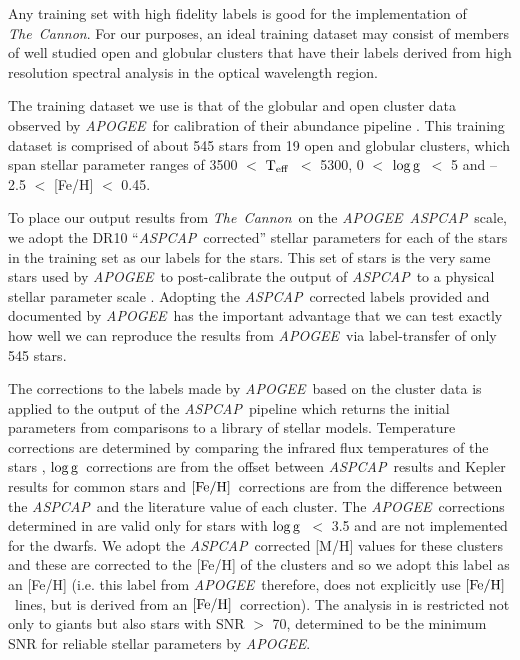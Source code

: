 \documentclass[12pt, preprint]{aastex}
\newcommand{\teff}{\mbox{$\rm T_{eff}$}}
\newcommand{\feh}{\mbox{$\rm [Fe/H]$}}
\newcommand{\logg}{\mbox{$\rm \log g$}}
\newcommand{\tc}{\textsl{The~Cannon}}
\newcommand{\apogee}{\textsl{APOGEE}}
\newcommand{\aspcap}{\textsl{ASPCAP}}
\begin{document}
Any training set with high fidelity labels is good for the implementation of \tc. For our purposes, an ideal training dataset may consist of members of
well studied open and globular clusters that have their labels derived from high resolution spectral analysis in the
optical wavelength region.


The training dataset we use is that of the globular and open cluster data observed by \apogee\ for calibration of their abundance pipeline \citep{Meszaros2013}. This training dataset is comprised of about 545 stars from 19 open and globular clusters, which span stellar parameter ranges of 3500 $<$ \teff\ $<$ 5300, 0 $<$ \logg\ $<$ 5 and --2.5 $<$ [Fe/H] $<$ 0.45. 


To place our output results from \tc\ on the \apogee\ \aspcap\ scale, we adopt the DR10 ``\aspcap\ corrected'' stellar parameters for each of the stars in the training set as our labels for the stars. This set of stars is the very same stars used by \apogee\ to  post-calibrate the output of \aspcap\ to a physical stellar parameter scale \citep{Meszaros2013}. Adopting the \aspcap\ corrected labels provided and documented by \apogee\  has the important advantage that we can test exactly how well we can reproduce the results from \apogee\ via label-transfer of only 545 stars.

The corrections to the labels made by \apogee\ based on the cluster data is applied to the output of the \aspcap\ pipeline which returns the initial parameters from comparisons to a library of stellar models. Temperature corrections are determined by comparing the infrared flux temperatures of the stars \citep{gonzalez2009}, \logg\ corrections are from the offset between \aspcap\ results and Kepler results for common stars and \feh\ corrections are from the difference between the \aspcap\ and  the literature value of each cluster.  The \apogee\ corrections determined in \citet{Meszaros2013} are valid only for stars with \logg\ $<$ 3.5 and are not implemented for the dwarfs.  We adopt the \aspcap\ corrected [M/H] values for these clusters and these are corrected to the [Fe/H] of the clusters and so we adopt this label as an [Fe/H] (i.e. this label from \apogee\ therefore, does not explicitly use \feh\ lines, but is derived from an \feh\ correction). The analysis in \citet{Meszaros2013} is restricted not only to giants but also stars with SNR $>$ 70, determined to be the minimum SNR for reliable stellar parameters by \apogee.
\end{document}
